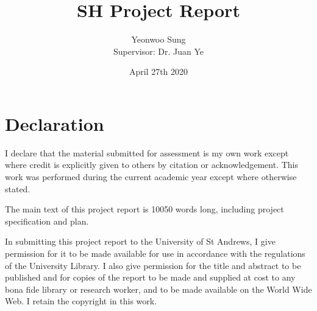 \documentclass{article}
\title{SH Project Report}
\author{Yeonwoo Sung\\[0.5cm]{Supervisor: Dr. Juan Ye}}
\date{April 27th 2020}
\begin{document}
\maketitle
\begin{center}
\end{center}

\newpage

\section*{Declaration}

I declare that the material submitted for assessment is my own work except where credit is explicitly given to others by citation or acknowledgement. 
This work was performed during the current academic year except where otherwise stated.

The main text of this project report is 10050 words long, including project specification and plan.

In submitting this project report to the University of St Andrews, I give permission for it to be made 
available for use in accordance with the regulations of the University Library. I also give permission for 
the title and abstract to be published and for copies of the report to be made and supplied at cost to any bona fide 
library or research worker, and to be made available on the World Wide Web. I retain the copyright in this work.
\end{document}
